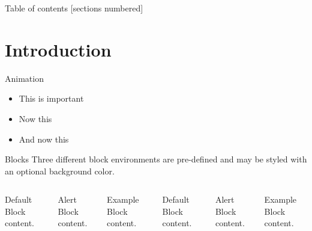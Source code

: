 \documentclass[10pt]{beamer}
\title{}
\subtitle{}
\date{February 1, 2024}
\author{Tommaso Bocchietti}
\institute{University of Waterloo}
\begin{document}
\maketitle

\begin{frame}{Table of contents}
    [sections numbered]
    \tableofcontents[hideallsubsections]
\end{frame}

\section{Introduction}

\begin{frame}{Animation}
    \begin{itemize}[<+- | alert@+>]
        \item \alert<4>{This is important}
        \item Now this
        \item And now this
    \end{itemize}
\end{frame}

\begin{frame}{Blocks}
    Three different block environments are pre-defined and may be styled with an
    optional background color.

    \begin{columns}[T,onlytextwidth]
        \begin{block}{Default}
            Block content.
        \end{block}

        \begin{alertblock}{Alert}
            Block content.
        \end{alertblock}

        \begin{exampleblock}{Example}
            Block content.
        \end{exampleblock}



        \begin{block}{Default}
            Block content.
        \end{block}

        \begin{alertblock}{Alert}
            Block content.
        \end{alertblock}

        \begin{exampleblock}{Example}
            Block content.
        \end{exampleblock}

    \end{columns}
\end{frame}
\end{document}
